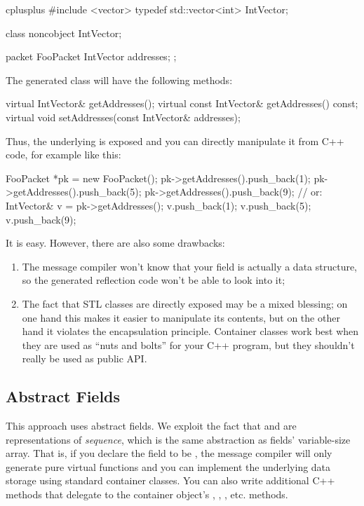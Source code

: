 \begin{msg}
cplusplus {{
#include <vector>
typedef std::vector<int> IntVector;
}}

class noncobject IntVector;

packet FooPacket {
    IntVector addresses;
};
\end{msg}

The generated class will have the following methods:

\begin{cpp}
virtual IntVector& getAddresses();
virtual const IntVector& getAddresses() const;
virtual void setAddresses(const IntVector& addresses);
\end{cpp}

Thus, the underlying  is exposed and you can directly
manipulate it from C++ code, for example like this:

\begin{cpp}
FooPacket *pk = new FooPacket();
pk->getAddresses().push_back(1);
pk->getAddresses().push_back(5);
pk->getAddresses().push_back(9);
// or:
IntVector& v = pk->getAddresses();
v.push_back(1);
v.push_back(5);
v.push_back(9);
\end{cpp}

It is easy. However, there are also some drawbacks:

\begin{enumerate}
  \item The message compiler won't know that your field is actually
      a data structure, so the generated reflection code won't be able
      to look into it;
  \item The fact that STL classes are directly exposed may be a mixed
      blessing; on one hand this makes it easier to manipulate its
      contents, but on the other hand it violates the encapsulation
      principle. Container classes work best when they are used as
      ``nuts and bolts'' for your C++ program, but they shouldn't really
      be used as public API.
\end{enumerate}

\subsection{Abstract Fields}

This approach uses abstract fields. We exploit the fact that
 and  are representations of
\textit{sequence}, which is the same abstraction as fields' variable-size
array. That is, if you declare the field to be ,
the message compiler will only generate pure virtual functions and you can
implement the underlying data storage using standard container classes. You
can also write additional C++ methods that delegate to the container
object's , , , etc. methods.

